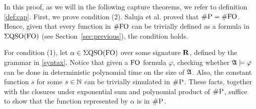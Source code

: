 In this proof, as we will in the following capture theorems, we refer to definition \ref{def:cap}. First, we prove condition (2). Saluja et al. proved that $\text{\sc \#P} = \#{\rm FO}$\cite{SalujaST95}. Hence, given that every function in $\#{\rm FO}$ can be trivially defined as a formula in $\Sigma{\rm QSO}({\rm FO})$ (see Section~\ref{sec:previous}), the condition holds.

For condition (1), let $\alpha\in\Sigma{\rm QSO}({\rm FO})$ over some signature $\mathbf{R}$, defined by the grammar in \ref{syntax}. Notice that given a ${\rm FO}$ formula $\varphi$, checking whether $\mathfrak{A}\models\varphi$ can be done in deterministic polynomial time on the size of $\mathfrak{A}$. Also, the constant function $s$ for some $s\in\mathbb{N}$ can be trivially simulated in $\text{\sc \#P}$. These facts, together with the closures under exponential sum and polynomial product of $\text{\sc \#P}$\cite{F97}, suffice to show that the function represented by $\alpha$ is in $\text{\sc \#P}$.

